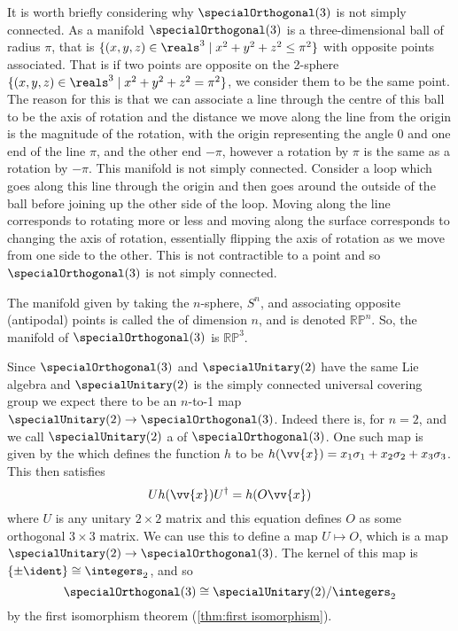 It is worth briefly considering why \(\specialOrthogonal(3)\) is not simply connected.
As a manifold \(\specialOrthogonal(3)\) is a three-dimensional ball of radius \(\pi\), that is \(\{(x, y, z) \in \reals^3 \mid x^2 + y^2 + z^2 \le \pi^2\}\) with opposite points associated.
That is if two points are opposite on the 2-sphere \(\{(x, y, z) \in \reals^3 \mid x^2 + y^2 + z^2 = \pi^2\}\), we consider them to be the same point.
The reason for this is that we can associate a line through the centre of this ball to be the axis of rotation and the distance we move along the line from the origin is the magnitude of the rotation, with the origin representing the angle 0 and one end of the line \(\pi\), and the other end \(-\pi\), however a rotation by \(\pi\) is the same as a rotation by \(-\pi\).
This manifold is not simply connected.
Consider a loop which goes along this line through the origin and then goes around the outside of the ball before joining up the other side of the loop.
Moving along the line corresponds to rotating more or less and moving along the surface corresponds to changing the axis of rotation, essentially flipping the axis of rotation as we move from one side to the other.
This is not contractible to a point and so \(\specialOrthogonal(3)\) is not simply connected.

The manifold given by taking the \(n\)-sphere, \(S^n\), and associating opposite (antipodal) points is called the  of dimension \(n\), and is denoted \(\mathbb{RP}^n\).
So, the manifold of \(\specialOrthogonal(3)\) is \(\mathbb{RP}^3\).

Since \(\specialOrthogonal(3)\) and \(\specialUnitary(2)\) have the same Lie algebra and \(\specialUnitary(2)\) is the simply connected universal covering group we expect there to be an \(n\)-to-1 map \(\specialUnitary(2) \to \specialOrthogonal(3)\).
Indeed there is, for \(n = 2\), and we call \(\specialUnitary(2)\) a  of \(\specialOrthogonal(3)\).
One such map is given by the  which defines the function \(h\) to be \(h(\vv{x}) = x_1\sigma_1 + x_2\sigma_2 + x_3\sigma_3\).
This then satisfies
\begin{equation}
    Uh(\vv{x})U^\hermit = h(O\vv{x})
\end{equation}
where \(U\) is any unitary \(2\times 2\) matrix and this equation defines \(O\) as some orthogonal \(3\times 3\) matrix.
We can use this to define a map \(U \mapsto O\), which is a map \(\specialUnitary(2) \to \specialOrthogonal(3)\).
The kernel of this map is \(\{\pm \ident\} \isomorphic \integers_2\), and so
\begin{equation}
    \specialOrthogonal(3) \isomorphic \specialUnitary(2) / \integers_2
\end{equation}
by the first isomorphism theorem (\cref{thm:first isomorphism}).


